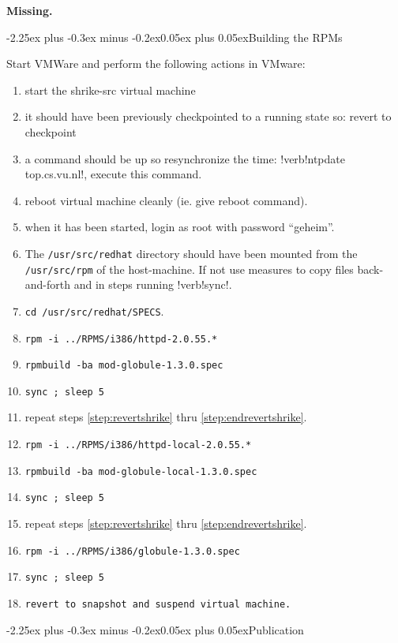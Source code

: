 \documentclass[10pt,twoside]{article}
\makeatletter
\def\subsection{\@startsection{subsection}{2}
{\z@}{-2.25ex plus -0.3ex minus -0.2ex}{0.05ex plus 0.05ex}{\normalsize\bf}}
\makeatother
\begin{document}
\textbf{Missing.}

\subsection{Building the RPMs}

Start VMWare and perform the following actions in VMware:

\begin{enumerate}
\item start the shrike-src virtual machine
\item{\label{step:revertshrike} it should have been previously checkpointed to
   a running state so: revert to checkpoint}
\item a command should be up so resynchronize the time:
   !verb!ntpdate top.cs.vu.nl!,  execute this command.
\item reboot virtual machine cleanly (ie. give reboot command).
\item when it has been started, login as root with password ``geheim''.
\item The \verb!/usr/src/redhat! directory should have been mounted from the
   \verb!/usr/src/rpm! of the host-machine.  If not use measures to copy files
   back-and-forth and in steps running !verb!sync!.
\item \label{step:endrevertshrike} \verb!cd /usr/src/redhat/SPECS!.
\item \verb!rpm -i ../RPMS/i386/httpd-2.0.55.*!
\item \verb!rpmbuild -ba mod-globule-1.3.0.spec!
\item \verb!sync ; sleep 5!
\item repeat steps \ref{step:revertshrike} thru \ref{step:endrevertshrike}.
\item \verb!rpm -i ../RPMS/i386/httpd-local-2.0.55.*!
\item \verb!rpmbuild -ba mod-globule-local-1.3.0.spec!
\item \verb!sync ; sleep 5!
\item repeat steps \ref{step:revertshrike} thru \ref{step:endrevertshrike}.
\item \verb!rpm -i ../RPMS/i386/globule-1.3.0.spec!
\item \verb!sync ; sleep 5!
\item \verb!revert to snapshot and suspend virtual machine.!
\end{enumerate}

\subsection{Publication}
\end{document}
